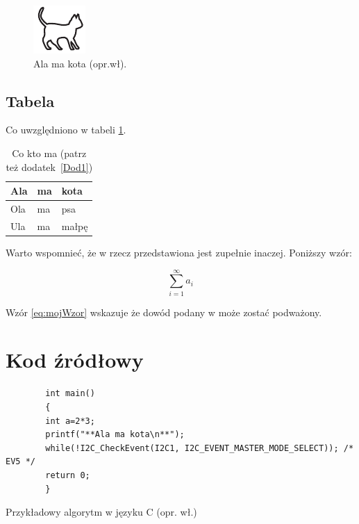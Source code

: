 \begin{figure}[h!]
    \centering\includegraphics[width=.4\textwidth]{img/kotek}
    \caption{Ala ma kota (opr.wł).}\label{rysunek:kot}
\end{figure}

\subsection{Tabela}

Co uwzględniono w tabeli \ref{tabela:coktoma}. \lipsum[13-15]

\begin{table}[h!]
    \centering\caption{Co kto ma \cite{harel_rzecz_2008} (patrz też dodatek~\ref{Dod1}) \label{tabela:coktoma}}
    \begin{tabular}{|l|l|l|}%
        \hline
        Ala & ma & kota \\
        \hline
        Ola & ma & psa \\
        \hline
        Ula & ma & małpę\\
        \hline
    \end{tabular}
\end{table}

\lipsum[19-20] Warto wspomnieć, że w \cite{aizawa_groundwater_2009} rzecz przedstawiona jest zupełnie inaczej. Poniższy wzór:

\begin{equation}
    \sum_{i=1}^{\infty}a_i
    \label{eq:mojWzor}
\end{equation}

Wzór \ref{eq:mojWzor} wskazuje że dowód podany w \cite{kaleta_experimental_2005} może zostać podważony. \lipsum[9]

\section{Kod źródłowy}

\begin{listing}[h!]
    \begin{verbatim}
        int main()
        {
        int a=2*3;
        printf("**Ala ma kota\n**");
        while(!I2C_CheckEvent(I2C1, I2C_EVENT_MASTER_MODE_SELECT)); /* EV5 */
        return 0;
        }
    \end{verbatim}
    \caption{Przykładowy algorytm w języku C (opr. wł.)} \label{listing:moj}
\end{listing}

